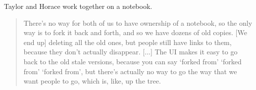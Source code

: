 Taylor and Horace work together on a notebook.

\begin{quote}
There's no way for both of us
to have ownership of a notebook, so the only way is to fork it back and forth,
and so we have dozens of old copies. [We end up] deleting all the old ones, but
people still have links to them, because they don't actually disappear. [...]
The UI makes it easy to go back to the old stale versions, because you can say
`forked from' `forked from' `forked from', but there's actually no way to go the
way that we want people to go, which is, like, up the tree.
\end{quote}

